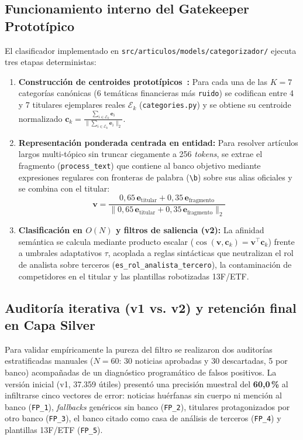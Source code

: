 \subsection{Funcionamiento interno del Gatekeeper Prototípico}
El clasificador implementado en \texttt{src/articulos/models/categorizador/} ejecuta tres etapas deterministas:

\begin{enumerate}
    \item \textbf{Construcción de centroides prototípicos~\cite{snell2017prototypical}:} Para cada una de las $K=7$ categorías canónicas (6 temáticas financieras más \texttt{ruido}) se codifican entre 4 y 7 titulares ejemplares reales $\mathcal{E}_k$ (\texttt{categories.py}) y se obtiene su centroide normalizado $\mathbf{c}_k = \frac{\sum_{i \in \mathcal{E}_k} \mathbf{e}_i}{\|\sum_{i \in \mathcal{E}_k} \mathbf{e}_i\|_2}$.
    \item \textbf{Representación ponderada centrada en entidad:} Para resolver artículos largos multi-tópico sin truncar ciegamente a 256 \textit{tokens}, se extrae el fragmento (\texttt{process\_text}) que contiene al banco objetivo mediante expresiones regulares con fronteras de palabra (\texttt{\textbackslash b}) sobre sus alias oficiales y se combina con el titular:
    \begin{equation}
        \mathbf{v} = \frac{0{,}65\,\mathbf{e}_{\text{titular}} + 0{,}35\,\mathbf{e}_{\text{fragmento}}}{\|0{,}65\,\mathbf{e}_{\text{titular}} + 0{,}35\,\mathbf{e}_{\text{fragmento}}\|_2}
        \label{eq:gatekeeper_blend}
    \end{equation}
    \item \textbf{Clasificación en $O(N)$ y filtros de saliencia (v2):} La afinidad semántica se calcula mediante producto escalar ($\cos(\mathbf{v}, \mathbf{c}_k) = \mathbf{v}^\top \mathbf{c}_k$) frente a umbrales adaptativos $\tau$, acoplada a reglas sintácticas que neutralizan el rol de analista sobre terceros (\texttt{es\_rol\_\allowbreak analista\_tercero}), la contaminación de competidores en el titular y las plantillas robotizadas 13F/ETF.
\end{enumerate}

\subsection{Auditoría iterativa (v1 vs. v2) y retención final en Capa Silver}
Para validar empíricamente la pureza del filtro se realizaron dos auditorías estratificadas manuales ($N=60$: 30 noticias aprobadas y 30 descartadas, 5 por banco) acompañadas de un diagnóstico programático de falsos positivos. La versión inicial (v1, 37.359 útiles) presentó una precisión muestral del \textbf{60,0\,\%} al infiltrarse cinco vectores de error: noticias huérfanas sin cuerpo ni mención al banco (\texttt{FP\_1}), \textit{fallbacks} genéricos sin banco (\texttt{FP\_2}), titulares protagonizados por otro banco (\texttt{FP\_3}), el banco citado como casa de análisis de terceros (\texttt{FP\_4}) y plantillas 13F/ETF (\texttt{FP\_5}).

